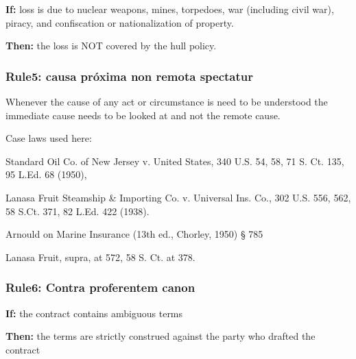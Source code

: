     
    \textbf{If:} loss is due to nuclear weapons, mines, torpedoes, war (including civil war), piracy, and confiscation or nationalization of property.
    
    \textbf{Then:} the loss is NOT covered by the hull policy.


\subsubsection{Rule5: causa próxima non remota spectatur}

Whenever the cause of any act or circumstance is need to be understood the immediate cause needs to be looked at and not the remote cause.

Case laws used here:

Standard Oil Co. of New Jersey v. United States, 340 U.S. 54, 58, 71 S. Ct. 135, 95 L.Ed. 68 (1950),

Lanasa Fruit Steamship \& Importing Co. v. Universal Ins. Co., 302 U.S. 556, 562, 58 S.Ct. 371, 82 L.Ed. 422 (1938).

Arnould on Marine Insurance (13th ed., Chorley, 1950) § 785

Lanasa Fruit, supra, at 572, 58 S. Ct. at 378.

\subsubsection{Rule6: Contra proferentem canon}

    \textbf{If: } the contract contains ambiguous terms
    
    \textbf{Then:} the terms are strictly construed against the party who drafted the contract




